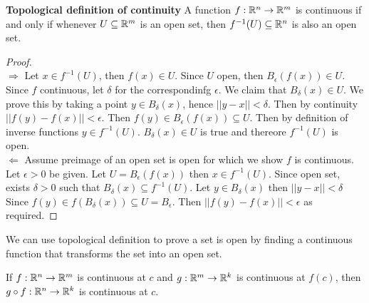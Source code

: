 \documentclass[11pt]{article}
\begin{document}
\begin{theorem}
  \label{Topological definition of continuity}
  \textbf{Topological definition of continuity} A function $f:\mathbb{R}^n \to \mathbb{R}^m$ is continuous if and only if whenever $U\subseteq \mathbb{R}^m$ is an open set, then $f^{-1}(U) \subseteq \mathbb{R}^n$ is also an open set.
  \begin{proof}
    $ $\\
    $\Rightarrow$ Let $x\in f^{-1}(U)$, then $f(x)\in U$. Since $U$ open, then $B_{\epsilon}(f(x))\in U$. Since $f$ continuous, let $\delta$ for the correspondinfg $\epsilon$. We claim that $B_{\delta}(x)\in U$. We prove this by taking a point $y\in B_{\delta}(x)$, hence $||y-x|| < \delta$. Then by continuity $||f(y)-f(x)|| < \epsilon$. Then $f(y)\in B_{\epsilon}(f(x))\subseteq U$. Then by definition of inverse functions $y\in f^{-1}(U)$. $B_{\delta}(x)\in U$ is true and thereore $f^{-1}(U)$ is open.\\
    $\Leftarrow$ Assume preimage of an open set is open for which we show $f$ is continuous. Let $\epsilon > 0$ be given. Let $U = B_{\epsilon}(f(x))$ then $x\in f^{-1}(U)$. Since open set, exists $\delta > 0$ such that $B_{\delta}(x) \subseteq f^{-1}(U)$. Let $y\in B_{\delta}(x)$ then $|| y - x|| < \delta$ Since $f(y) \in f(B_{\delta}(x)) \subseteq U = B_{\epsilon}$. Then $||f(y)-f(x)|| < \epsilon$ as required.
  \end{proof}
  \begin{rem}
    We can use topological definition to prove a set is open by finding a continuous function that transforms the set into an open set.
  \end{rem}
\end{theorem}

\begin{theorem}
  If $f:\mathbb{R}^n \to \mathbb{R}^m$ is continuous at $c$ and $g:\mathbb{R}^m \to \mathbb{R}^k$ is continuous at $f(c)$, then $g\circ f: \mathbb{R}^n \to \mathbb{R}^k$ is continuous at $c$.
\end{theorem}
\end{document}
